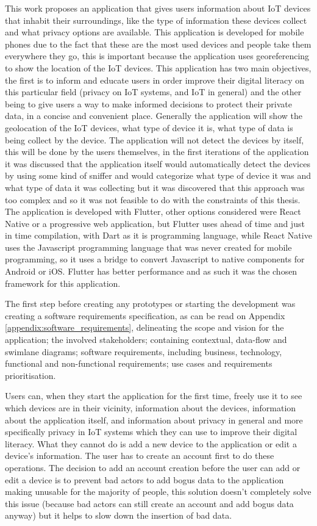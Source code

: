 This work proposes an application that gives users information about IoT
devices that inhabit their surroundings, like the type of information these devices
collect and what privacy options are available. This application is developed
for mobile phones due to the fact that these are the most used devices
and people take them everywhere they go, this is important because the application
uses georeferencing to show the location of the IoT devices. This application
has two main objectives, the first is to inform and educate users in order improve
their digital literacy on this particular field (privacy on IoT systems, and
IoT in general) and the other being to give users a way to make informed decisions
to protect their private data, in a concise and convenient place. Generally
the application will show the geolocation of the IoT devices, what type of
device it is, what type of data is being collect by the device. The application
will not detect the devices by itself, this will be done by the users themselves,
in the first iterations of the application it was discussed that the application
itself would automatically detect the devices by using some kind of sniffer
and would categorize what type of device it was and what type of data it
was collecting but it was discovered that this approach was too complex and
so it was not feasible to do with the constraints of this thesis. The application
is developed with Flutter, other options considered were React Native or a
progressive web application, but Flutter uses ahead of time and just in time
compilation, with Dart as it is programming language, while React Native uses
the Javascript programming language that was never created for mobile programming,
so it uses a bridge to convert Javascript to native components for Android
or iOS. Flutter has better performance and as such it was the chosen framework
for this application.

The first step before creating any prototypes or starting the development was
creating a software requirements specification, as can be read on Appendix \ref{appendix:software_requirements},
delineating the scope and vision for the application; the involved stakeholders;
containing contextual, data-flow and swimlane diagrams; software requirements, including
business, technology, functional and non-functional requirements; use cases
and requirements prioritisation.

Users can, when they start the application for the first time, freely use it to see
which devices are in their vicinity,
information about the devices, information about the application itself, and
information about privacy in general and more specifically privacy in IoT systems
which they can use to improve their digital literacy. What they cannot do is
add a new device to the application or edit a device's information. The user has
to create an account first to do these operations. The decision to add an
account creation before the user can add or edit a device is to prevent
bad actors to add bogus data to the application making unusable for the majority
of people, this solution doesn't completely solve this issue (because bad actors
can still create an account and add bogus data anyway) but it helps to slow
down the insertion of bad data.

